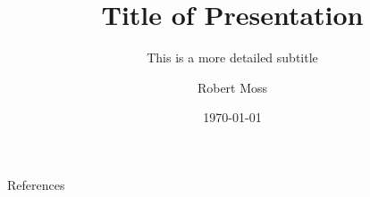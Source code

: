 \documentclass[aspectratio=169]{beamer}
\title{Title of Presentation}
\subtitle{This is a more detailed subtitle}
\author{Robert Moss}
\institute{Stanford University}
\date{\today}
\begin{document}
\begin{frame}
    \maketitle
\end{frame}








\begin{frame}{References}
    \printbibliography
\end{frame}
\end{document}

